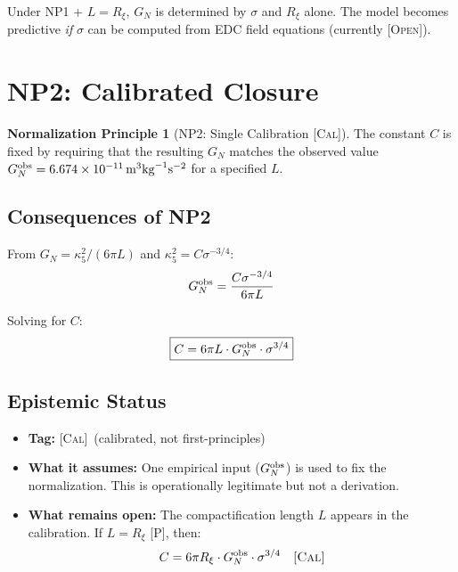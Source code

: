 \documentclass[11pt,a4paper]{article}
\theoremstyle{definition}
\newtheorem{principle}{Normalization Principle}
\newcommand{\Post}{\textsc{[P]}}
\newcommand{\Open}{\textsc{[Open]}}
\newcommand{\Cal}{\textsc{[Cal]}}
\begin{document}
Under NP1 + $L = R_\xi$, $G_N$ is determined by $\sigma$ and $R_\xi$ alone.
The model becomes predictive \textit{if} $\sigma$ can be computed from
EDC field equations (currently \Open).

\section{NP2: Calibrated Closure}
\label{sec:np2}

\begin{principle}[NP2: Single Calibration \Cal]
\label{np2}
The constant $C$ is fixed by requiring that the resulting $G_N$ matches
the observed value $G_N^{\rm obs} = 6.674 \times 10^{-11}\,\text{m}^3
\text{kg}^{-1}\text{s}^{-2}$ for a specified $L$.
\end{principle}

\subsection{Consequences of NP2}

From $G_N = \kappa_5^2 / (6\pi L)$ and $\kappa_5^2 = C \sigma^{-3/4}$:
\begin{equation}
G_N^{\rm obs} = \frac{C \sigma^{-3/4}}{6\pi L}
\end{equation}

Solving for $C$:
\begin{equation}
\boxed{C = 6\pi L \cdot G_N^{\rm obs} \cdot \sigma^{3/4}}
\label{eq:c_np2}
\end{equation}

\subsection{Epistemic Status}

\begin{itemize}
\item \textbf{Tag:} \Cal\ (calibrated, not first-principles)
\item \textbf{What it assumes:} One empirical input ($G_N^{\rm obs}$) is
used to fix the normalization. This is operationally legitimate but not
a derivation.
\item \textbf{What remains open:} The compactification length $L$ appears
in the calibration. If $L = R_\xi$ \Post, then:
\begin{equation}
C = 6\pi R_\xi \cdot G_N^{\rm obs} \cdot \sigma^{3/4}
\quad \text{\Cal}
\label{eq:c_np2_rxi}
\end{equation}
\end{itemize}
\end{document}
